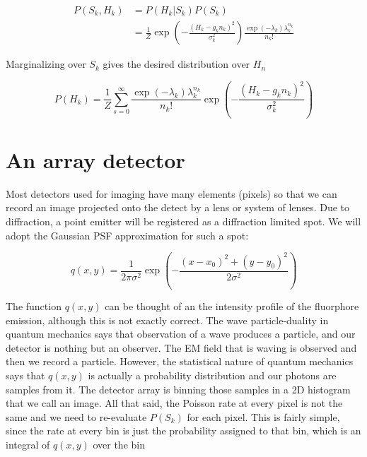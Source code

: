 \documentclass{article}
\begin{document}
\vspace{0.1in}
\begin{align*}
P(S_{k},H_{k}) &= P(H_{k}|S_{k})P(S_{k})\\
&= \frac{1}{Z}\exp\left(-\frac{(H_{k}-g_{k}n_{k})^{2}}{\sigma_{k}^{2}}\right)\frac{\exp\left({-\lambda_{k}}\right)\lambda_{k}^{n_{k}}}{n_{k}!}
\end{align*}
\vspace{0.1in}

Marginalizing over $S_{k}$ gives the desired distribution over $H_{n}$

\begin{equation*}
P(H_{k}) = \frac{1}{Z}\sum_{s=0}^{\infty}\frac{\exp\left({-\lambda_{k}}\right)\lambda_{k}^{n_{k}}}{n_{k}!}\exp\left(-\frac{(H_{k}-g_{k}n_{k})^{2}}{\sigma_{k}^{2}}\right)
\end{equation*}

\section{An array detector}

Most detectors used for imaging have many elements (pixels) so that we can record an image projected onto the detect by a lens or system of lenses. Due to diffraction, a point emitter will be registered as a diffraction limited spot. We will adopt the Gaussian PSF approximation for such a spot:

\begin{equation*}
q(x,y) = \frac{1}{2\pi\sigma^{2}}\exp\left(-\frac{(x-x_{0})^{2}+(y-y_{0})^{2}}{2\sigma^{2}}\right)
\end{equation*}

The function $q(x,y)$ can be thought of an the intensity profile of the fluorphore emission, although this is not exactly correct. The wave particle-duality in quantum mechanics says that observation of a wave produces a particle, and our detector is nothing but an observer. The EM field that is waving is observed and then we record a particle. However, the statistical nature of quantum mechanics says that $q(x,y)$ is actually a probability distribution and our photons are samples from it. The detector array is binning those samples in a 2D histogram that we call an image. All that said, the Poisson rate at every pixel is not the same and we need to re-evaluate $P(S_{k})$ for each pixel. This is fairly simple, since the rate at every bin is just the probability assigned to that bin, which is an integral of $q(x,y)$ over the bin
\end{document}
